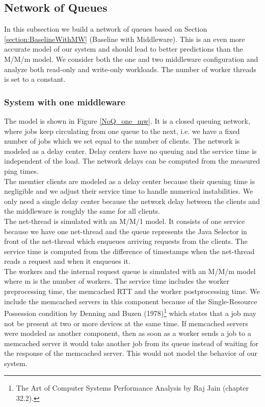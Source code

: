 \subsection{Network of Queues}

In this subsection we build a network of queues based on Section \ref{section:BaselineWithMW} (Baseline with Middleware). This is an even more accurate model of our system and should lead to better predictions than the M/M/m model.
We consider both the one and two middleware configuration and analyze both read-only and write-only workloads. The number of worker threads is set to a constant. 

\subsubsection{System with one middleware}
The model is shown in Figure \ref{NoQ_one_mw}. 
It is a closed queuing network, where jobs keep circulating from one queue to the next, i.e. we have a fixed number of jobs which we set equal to the number of clients. 
The network is modeled as a delay center. Delay centers have no queuing and the service time is independent of the load. The network delays can be computed from the measured ping times. \\
The memtier clients are modeled as a delay center because their queuing time is negligible and we adjust their service time to handle numerical instabilities. We only need a single delay center because the network delay between the clients and the middleware is roughly the same for all clients. \\
The net-thread is simulated with an M/M/1 model. It consists of one service because we have one net-thread and the queue represents the Java Selector in front of the net-thread which enqueues arriving requests from the clients. The service time is computed from the difference of timestamps when the net-thread reads a request and when it enqueues it. \\
The workers and the internal request queue is simulated with an M/M/m model where m is the number of workers. The service time includes the worker preprocessing time, the memcached RTT and the worker postprocessing time. We include the memcached servers in this component because of the Single-Resource Possession condition by Denning and Buzen (1978)\footnote{The Art of Computer Systems Performance Analysis by Raj Jain (chapter 32.2).} which states that a job may not be present at two or more devices at the same time.  If memcached servers were modeled as another component, then as soon as a worker sends a job to a memcached server it would take another job from its queue instead of waiting for the response of the memcached server. This would not model the behavior of our system. 

